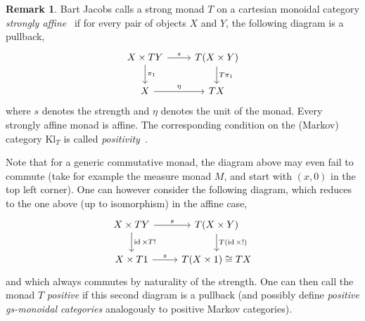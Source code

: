\documentclass[a4paper,UKenglish,numberwithinsect,cleveref, autoref, thm-restate]{lipics-v2021}
\theoremstyle{plain} %
\theoremstyle{definition} %
\newtheorem{myremark}[mytheorem]{Remark}
\begin{document}
\begin{myremark}
 Bart Jacobs calls a strong monad $T$ on a cartesian monoidal category \emph{strongly affine}~\cite{Jacobs16} if for every pair of objects $X$ and $Y$, the following diagram is a pullback,
 \[
  \begin{tikzcd}
   X \times TY \ar{d}{\pi_1} \ar{r}{s} & T(X\times Y) \ar{d}{T\pi_1} \\
   X \ar{r}{\eta} & TX
  \end{tikzcd}
 \]
where $s$ denotes the strength and $\eta$ denotes the unit of the monad. Every strongly affine monad is affine. 
The corresponding condition on the (Markov) category $\mathrm{Kl}_T$ is called \emph{positivity}~\cite[Section~2]{fritz2022dilations}.

Note that for a generic commutative monad, the diagram above may even fail to commute (take for example the measure monad $M$, and start with $(x,0)$ in the top left corner). One can however consider the following diagram, which reduces to the one above (up to isomorphism) in the affine case,
\[
 \begin{tikzcd}
   X \times TY \ar{d}{\id\times T!} \ar{r}{s} & T(X\times Y) \ar{d}{T(\id\times!)} \\
   X \times T1 \ar{r}{s} & T(X\times 1) \cong TX
  \end{tikzcd}
\]
and which always commutes by naturality of the strength.
One can then call the monad $T$ \emph{positive} if this second diagram is a pullback (and possibly define \emph{positive gs-monoidal categories} analogously to positive Markov categories). 
\end{myremark}



\end{document}
